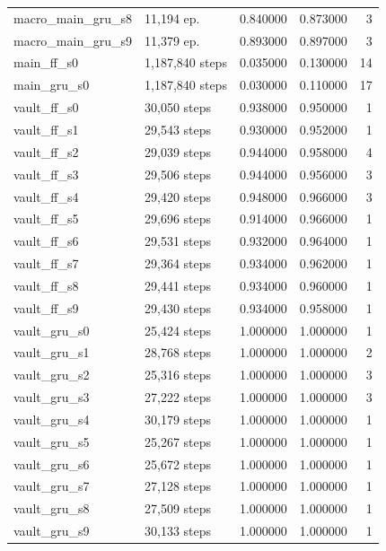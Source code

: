 \begin{tabular}{llrrr}
macro\_main\_gru\_s8 & 11,194 ep. & 0.840000 & 0.873000 & 3 \\
macro\_main\_gru\_s9 & 11,379 ep. & 0.893000 & 0.897000 & 3 \\
main\_ff\_s0 & 1,187,840 steps & 0.035000 & 0.130000 & 14 \\
main\_gru\_s0 & 1,187,840 steps & 0.030000 & 0.110000 & 17 \\
vault\_ff\_s0 & 30,050 steps & 0.938000 & 0.950000 & 1 \\
vault\_ff\_s1 & 29,543 steps & 0.930000 & 0.952000 & 1 \\
vault\_ff\_s2 & 29,039 steps & 0.944000 & 0.958000 & 4 \\
vault\_ff\_s3 & 29,506 steps & 0.944000 & 0.956000 & 3 \\
vault\_ff\_s4 & 29,420 steps & 0.948000 & 0.966000 & 3 \\
vault\_ff\_s5 & 29,696 steps & 0.914000 & 0.966000 & 1 \\
vault\_ff\_s6 & 29,531 steps & 0.932000 & 0.964000 & 1 \\
vault\_ff\_s7 & 29,364 steps & 0.934000 & 0.962000 & 1 \\
vault\_ff\_s8 & 29,441 steps & 0.934000 & 0.960000 & 1 \\
vault\_ff\_s9 & 29,430 steps & 0.934000 & 0.958000 & 1 \\
vault\_gru\_s0 & 25,424 steps & 1.000000 & 1.000000 & 1 \\
vault\_gru\_s1 & 28,768 steps & 1.000000 & 1.000000 & 2 \\
vault\_gru\_s2 & 25,316 steps & 1.000000 & 1.000000 & 3 \\
vault\_gru\_s3 & 27,222 steps & 1.000000 & 1.000000 & 3 \\
vault\_gru\_s4 & 30,179 steps & 1.000000 & 1.000000 & 1 \\
vault\_gru\_s5 & 25,267 steps & 1.000000 & 1.000000 & 1 \\
vault\_gru\_s6 & 25,672 steps & 1.000000 & 1.000000 & 1 \\
vault\_gru\_s7 & 27,128 steps & 1.000000 & 1.000000 & 1 \\
vault\_gru\_s8 & 27,509 steps & 1.000000 & 1.000000 & 1 \\
vault\_gru\_s9 & 30,133 steps & 1.000000 & 1.000000 & 1 \\
\bottomrule
\end{tabular}
